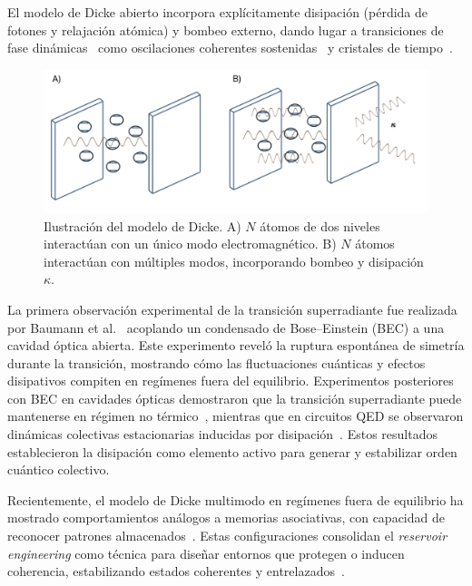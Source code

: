 \documentclass[onecolumn,notitlepage,letterpaper,aps,pra,12pt]{article}
\numberwithin{equation}{section}
\begin{document}
El modelo de Dicke abierto incorpora explícitamente disipación (pérdida de fotones y relajación atómica) y bombeo externo, dando lugar a transiciones de fase dinámicas~\cite{kirton2017,LeBoite2020} como oscilaciones coherentes sostenidas~\cite{mivehvar2021} y cristales de tiempo~\cite{zhu2019}.

\begin{figure}[H]
    \centering
    \includegraphics[width=0.9\linewidth]{Images/cavity1.png}
    \caption{Ilustración del modelo de Dicke. 
A) \( N \) átomos de dos niveles interactúan con un único modo electromagnético. 
B) \( N \) átomos interactúan con múltiples modos, incorporando bombeo y disipación \( \kappa \).}
    \label{Figure Cavity}
\end{figure}

La primera observación experimental de la transición superradiante fue realizada por Baumann et al.~\cite{Baumann11} acoplando un condensado de Bose–Einstein (BEC) a una cavidad óptica abierta. Este experimento reveló la ruptura espontánea de simetría durante la transición, mostrando cómo las fluctuaciones cuánticas y efectos disipativos compiten en regímenes fuera del equilibrio. Experimentos posteriores con BEC en cavidades ópticas demostraron que la transición superradiante puede mantenerse en régimen no térmico~\cite{Klinder15}, mientras que en circuitos QED se observaron dinámicas colectivas estacionarias inducidas por disipación~\cite{Blais2021}. Estos resultados establecieron la disipación como elemento activo para generar y estabilizar orden cuántico colectivo.


Recientemente, el modelo de Dicke multimodo en regímenes fuera de equilibrio ha mostrado comportamientos análogos a memorias asociativas, con capacidad de reconocer patrones almacenados~\cite{fiorelli2020}.  Estas configuraciones consolidan el \textit{reservoir engineering} como técnica para diseñar entornos que protegen o inducen coherencia, estabilizando estados coherentes y entrelazados~\cite{poyatos1996}.
\end{document}
